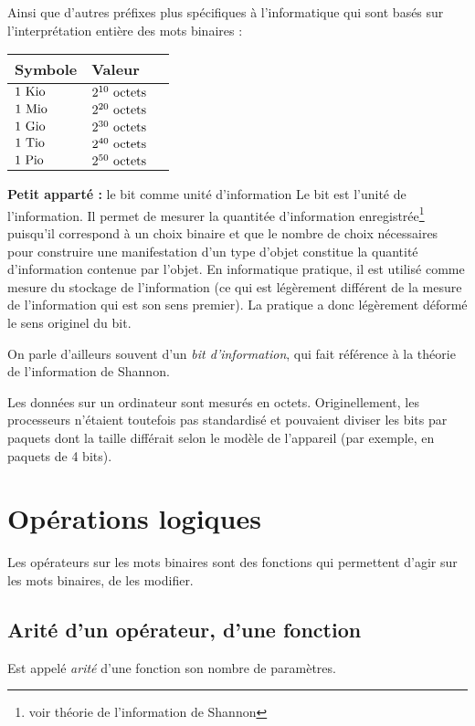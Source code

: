 \documentclass[../../main.tex]{subfiles}
\begin{document}
Ainsi que d'autres préfixes plus spécifiques à l'informatique qui sont basés sur l'interprétation entière des mots binaires :

\begin{center}
  \begin{tabular}{|l|l|l|}
  \hline 
  \textbf{Symbole} & \textbf{Valeur} \\
  \hline
  $1\ \rm{Kio}$ & $2^{10}\ \rm{octets}$ \\
  $1\ \rm{Mio}$ & $2^{20}\ \rm{octets}$ \\
  $1\ \rm{Gio}$ & $2^{30}\ \rm{octets}$ \\
  $1\ \rm{Tio}$ & $2^{40}\ \rm{octets}$ \\
  $1\ \rm{Pio}$ & $2^{50}\ \rm{octets}$ \\
  \hline
  \end{tabular}
\end{center}

\begin{minitelbasicbox}{\textbf{Petit apparté :} le bit comme unité d'information}
Le bit est l'unité de l'information. Il permet de mesurer la quantitée d'information enregistrée\footnote{voir théorie de l'information de Shannon} puisqu'il correspond à un choix binaire et que le nombre de choix nécessaires pour construire une manifestation d'un type d'objet constitue la quantité d'information contenue par l'objet. En informatique pratique, il est utilisé comme mesure du stockage de l'information (ce qui est légèrement différent de la mesure de l'information qui est son sens premier). La pratique a donc légèrement déformé le sens originel du bit.

On parle d'ailleurs souvent d'un \textit{bit d'information}, qui fait référence à la théorie de l'information de Shannon.
\end{minitelbasicbox}
Les données sur un ordinateur sont mesurés en octets. Originellement, les processeurs n'étaient toutefois pas standardisé et pouvaient diviser les bits par paquets dont la taille différait selon le modèle de l'appareil (par exemple, en paquets de 4 bits).
\section{Opérations logiques}
\label{sec:op_rations_logiques}
Les opérateurs sur les mots binaires sont des fonctions qui permettent d'agir sur les mots binaires, de les modifier.
\subsection{Arité d'un opérateur, d'une fonction}
\label{sub:arit_d_un_op_rateur_d_une_fonction}
Est appelé \textit{arité} d'une fonction son nombre de paramètres.
\end{document}
